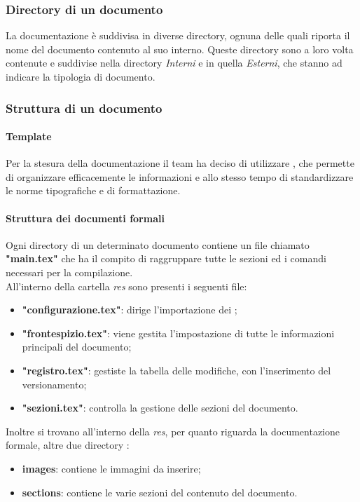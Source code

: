 \subsubsection{Directory di un documento}
La documentazione è suddivisa in diverse directory, ognuna delle quali riporta il nome del documento contenuto al suo interno. Queste directory sono a loro volta contenute e suddivise nella directory \textit{Interni} e in quella \textit{Esterni}, che stanno ad indicare la tipologia di documento.

\subsubsection{Struttura di un documento}
\paragraph{Template}
Per la stesura della documentazione il team ha deciso di utilizzare , che permette di organizzare efficacemente le informazioni e allo stesso tempo di standardizzare le norme tipografiche e di formattazione.

\paragraph{Struttura dei documenti formali}
Ogni directory di un determinato documento contiene un file chiamato \textbf{"main.tex"} che ha il compito di raggruppare tutte le sezioni ed i comandi necessari per la compilazione.\\
All'interno della cartella \textit{res} sono presenti i seguenti file:
\begin{itemize}
    \item \textbf{"configurazione.tex"}: dirige l'importazione dei ;
    \item \textbf{"frontespizio.tex"}: viene gestita l'impostazione di tutte le informazioni principali del documento;
    \item \textbf{"registro.tex"}: gestiste la tabella delle modifiche, con l'inserimento del versionamento;
    \item \textbf{"sezioni.tex"}: controlla la gestione delle sezioni del documento.
\end{itemize}
Inoltre si trovano all'interno della \textit{res}, per quanto riguarda la documentazione formale, altre due directory :
\begin{itemize}
    \item \textbf{images}: contiene le immagini da inserire;
    \item\textbf{sections}: contiene le varie sezioni del contenuto del documento.
\end{itemize}

